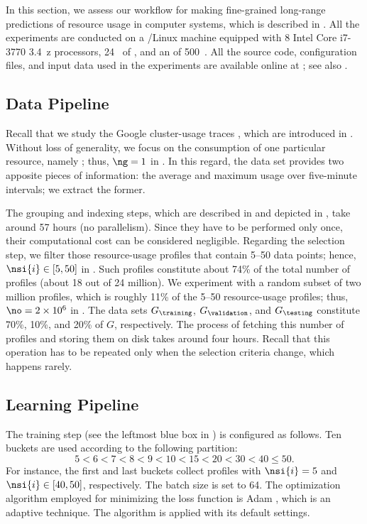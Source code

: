 In this section, we assess our workflow for making fine-grained long-range
predictions of resource usage in computer systems, which is described in
. All the experiments are conducted on a /Linux
machine equipped with 8 Intel Core i7-3770 3.4~z processors, 24~
of , and an  of 500~. All the source code, configuration
files, and input data used in the experiments are available online at
\cite{eslab2017b}; see also \cite{eslab2017c}.

\subsection{Data Pipeline}

Recall that we study the Google cluster-usage traces \cite{reiss2011}, which are
introduced in . Without loss of generality, we focus
on the consumption of one particular resource, namely ; thus, $\ng = 1$
in . In this regard, the data set provides two apposite
pieces of information: the average and maximum  usage over five-minute
intervals; we extract the former.

The grouping and indexing steps, which are described in
 and depicted in , take around 57
hours (no parallelism). Since they have to be performed only once, their
computational cost can be considered negligible. Regarding the selection step,
we filter those resource-usage profiles that contain 5--50 data points; hence,
$\nsi{i} \in [5, 50]$ in . Such profiles constitute about
74\% of the total number of profiles (about 18 out of 24 million). We experiment
with a random subset of two million profiles, which is roughly 11\% of the 5--50
resource-usage profiles; thus, $\no = 2 \times 10^6$ in .
The data sets $G_\training$, $G_\validation$, and $G_\testing$ constitute 70\%,
10\%, and 20\% of $G$, respectively. The process of fetching this number of
profiles and storing them on disk takes around four hours. Recall that this
operation has to be repeated only when the selection criteria change, which
happens rarely.

\subsection{Learning Pipeline}

The training step (see the leftmost blue box in ) is
configured as follows. Ten buckets are used according to the following
partition:
\[
  5 < 6 < 7 < 8 < 9 < 10 < 15 < 20 < 30 < 40 \leq 50.
\]
For instance, the first and last buckets collect profiles with $\nsi{i} = 5$ and
$\nsi{i} \in [40, 50]$, respectively. The batch size \nb is set to 64. The
optimization algorithm employed for minimizing the loss function is Adam
\cite{kingma2014}, which is an adaptive technique. The algorithm is applied with
its default settings.

